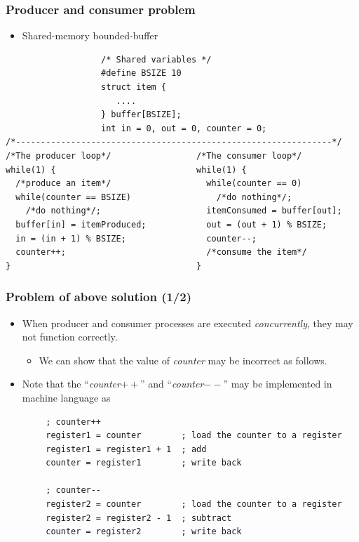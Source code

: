 \documentclass[CJKutf8,xcolor=pdftex,dvipsnames,table]{beamer}
\begin{document}
\begin{CJK*}{UTF8}{song}
  \begin{frame}[fragile]
  \frametitle{Producer and consumer problem} \pause
  \begin{itemize}
  \item{Shared-memory bounded-buffer} \pause
  \end{itemize}
\begin{lstlisting}
                   /* Shared variables */
                   #define BSIZE 10
                   struct item {
                      ....
                   } buffer[BSIZE];
                   int in = 0, out = 0, counter = 0;
/*---------------------------------------------------------------*/
/*The producer loop*/                 /*The consumer loop*/
while(1) {                            while(1) {
  /*produce an item*/                   while(counter == 0)
  while(counter == BSIZE)                 /*do nothing*/;
    /*do nothing*/;                     itemConsumed = buffer[out];
  buffer[in] = itemProduced;            out = (out + 1) % BSIZE;
  in = (in + 1) % BSIZE;                counter--;
  counter++;                            /*consume the item*/
}                                     }
\end{lstlisting}
\end{frame}

  \begin{frame}[fragile]
  \frametitle{Problem of above solution (1/2)} \pause
  \begin{itemize}
  \item{When producer and consumer processes are executed \emph{concurrently}, they may not function correctly.} \pause
    \begin{itemize}
    \item{We can show that the value of \textit{counter} may be incorrect as follows.} \pause
    \end{itemize}
  \item{Note that the ``\textit{counter}$++$'' and ``\textit{counter}$--$'' may be implemented in machine language as} \pause
  \end{itemize}

\begin{lstlisting}
        ; counter++
        register1 = counter        ; load the counter to a register
        register1 = register1 + 1  ; add
        counter = register1        ; write back

        ; counter--
        register2 = counter        ; load the counter to a register
        register2 = register2 - 1  ; subtract
        counter = register2        ; write back
\end{lstlisting}


\end{frame}
\end{CJK*}
\end{document}
